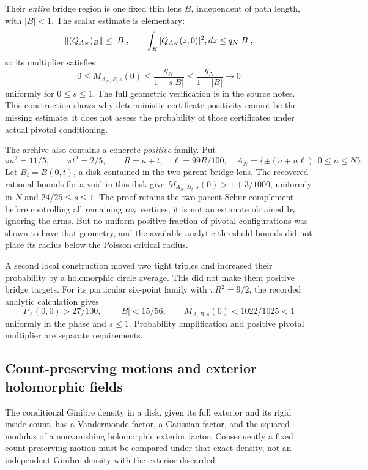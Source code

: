 \documentclass[11pt,a4paper]{article}
\theoremstyle{definition}
\theoremstyle{remark}
\numberwithin{equation}{section}
\begin{document}
Their \emph{entire} bridge region is one fixed thin lens $B$, independent
of path length, with $|B|<1$.  The scalar estimate is elementary:
\[
 \|(Q_{A_N})_B\|\leq|B|,
 \qquad
 \int_B|Q_{A_N}(z,0)|^2\\,dz\leq q_N|B|,
\]
so its multiplier satisfies
\begin{equation}
 0\leq M_{A_N,B,s}(0)
 \leq\frac{q_N}{1-s|B|}
 \leq\frac{q_N}{1-|B|}\longrightarrow0
 \label{br:saturated-multiplier}
\end{equation}
uniformly for $0\leq s\leq1$.  The full geometric verification is in
the source notes.  This construction shows why deterministic certificate
positivity cannot be the missing estimate; it does not assess the
probability of those certificates under actual pivotal conditioning.

The archive also contains a concrete \emph{positive} family.  Put
\[
 \pi a^2=11/5,\qquad\pi t^2=2/5,
 \qquad R=a+t,\quad\ell=99R/100,
 \quad A_N=\{\pm(a+n\ell):0\leq n\leq N\}.
\]
Let $B_t=B(0,t)$, a disk contained in the two-parent bridge lens.
The recovered rational bounds for a void in this disk give
$M_{A_N,B_t,s}(0)>1+3/1000$, uniformly in $N$ and
$24/25\leq s\leq1$.  The proof retains the two-parent Schur complement
before controlling all remaining ray vertices; it is not an estimate
obtained by ignoring the arms.  But no uniform positive fraction of
pivotal configurations was shown to have that geometry, and the
available analytic threshold bounds did not place its radius below the
Poisson critical radius.

A second local construction moved two tight triples and increased their
probability by a holomorphic circle average.  This did not make them
positive bridge targets.  For its particular six-point family with
$\pi R^2=9/2$, the recorded analytic calculation gives
\[
 P_A(0,0)>27/100,\qquad |B|<15/56,
 \qquad M_{A,B,s}(0)<1022/1025<1
\]
uniformly in the phase and $s\leq1$.  Probability amplification and
positive pivotal multiplier are separate requirements.

\subsection{Count-preserving motions and exterior holomorphic fields}
\label{br:motions}

The conditional Ginibre density in a disk, given its full exterior and
its rigid inside count, has a Vandermonde factor, a Gaussian factor, and
the squared modulus of a nonvanishing holomorphic exterior factor.
Consequently a fixed count-preserving motion must be compared under
that exact density, not an independent Ginibre density with the
exterior discarded.
\end{document}
